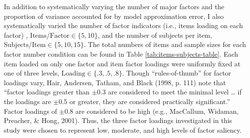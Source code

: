 \documentclass[man]{apa6}
\begin{document}
In addition to systematically varying the number of major factors and the proportion of variance accounted for by model approximation error, I also systematically varied the number of factor indicators (i.e., items loading on each factor) , \(\textrm{Items/Factor} \in \{5, 10 \}\), and the number of subjects per item, \(\textrm{Subjects/Item} \in \{ 5, 10, 15\}\). The total numbers of items and sample sizes for each factor number condition can be found in Table \ref{tab:items-subjects-table}. Each item loaded on only one factor and item factor loadings were uniformly fixed at one of three levels, \(\textrm{Loading} \in \{ .3, .5, .8 \}\). Though \enquote{rules-of-thumb} for factor loadings vary, Hair, Andersen, Tatham, and Black (1998, p. 111) note that \enquote{factor loadings greater than \(\pm 0.3\) are considered to meet the minimal level \ldots{} if the loadings are \(\pm 0.5\) or greater, they are considered practically significant.} Factor loadings of \(\pm 0.8\) are considered to be high (e.g., MacCallum, Widaman, Preacher, \& Hong, 2001). Thus, the three factor loadings investigated in this study were chosen to represent low, moderate, and high levels of factor saliency.
\end{document}
